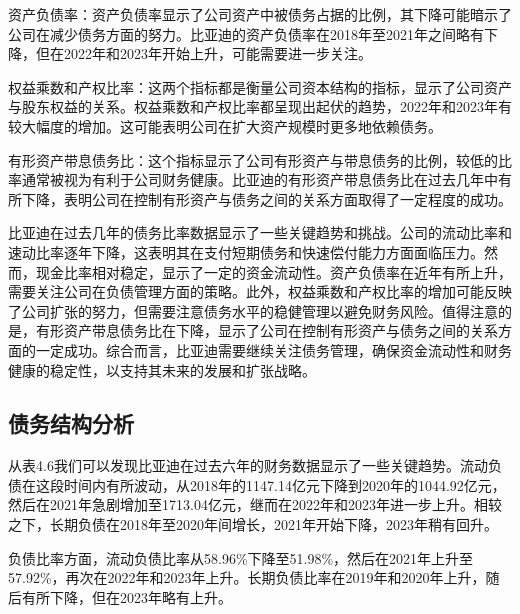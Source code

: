 资产负债率：资产负债率显示了公司资产中被债务占据的比例，其下降可能暗示了公司在减少债务方面的努力。比亚迪的资产负债率在2018年至2021年之间略有下降，但在2022年和2023年开始上升，可能需要进一步关注。

权益乘数和产权比率：这两个指标都是衡量公司资本结构的指标，显示了公司资产与股东权益的关系。权益乘数和产权比率都呈现出起伏的趋势，2022年和2023年有较大幅度的增加。这可能表明公司在扩大资产规模时更多地依赖债务。

有形资产带息债务比：这个指标显示了公司有形资产与带息债务的比例，较低的比率通常被视为有利于公司财务健康。比亚迪的有形资产带息债务比在过去几年中有所下降，表明公司在控制有形资产与债务之间的关系方面取得了一定程度的成功。


比亚迪在过去几年的债务比率数据显示了一些关键趋势和挑战。公司的流动比率和速动比率逐年下降，这表明其在支付短期债务和快速偿付能力方面面临压力。然而，现金比率相对稳定，显示了一定的资金流动性。资产负债率在近年有所上升，需要关注公司在负债管理方面的策略。此外，权益乘数和产权比率的增加可能反映了公司扩张的努力，但需要注意债务水平的稳健管理以避免财务风险。值得注意的是，有形资产带息债务比在下降，显示了公司在控制有形资产与债务之间的关系方面的一定成功。综合而言，比亚迪需要继续关注债务管理，确保资金流动性和财务健康的稳定性，以支持其未来的发展和扩张战略。
\subsection{债务结构分析}
从表4.6我们可以发现比亚迪在过去六年的财务数据显示了一些关键趋势。流动负债在这段时间内有所波动，从2018年的1147.14亿元下降到2020年的1044.92亿元，然后在2021年急剧增加至1713.04亿元，继而在2022年和2023年进一步上升。相较之下，长期负债在2018年至2020年间增长，2021年开始下降，2023年稍有回升。

负债比率方面，流动负债比率从58.96\%下降至51.98\%，然后在2021年上升至57.92\%，再次在2022年和2023年上升。长期负债比率在2019年和2020年上升，随后有所下降，但在2023年略有上升。

